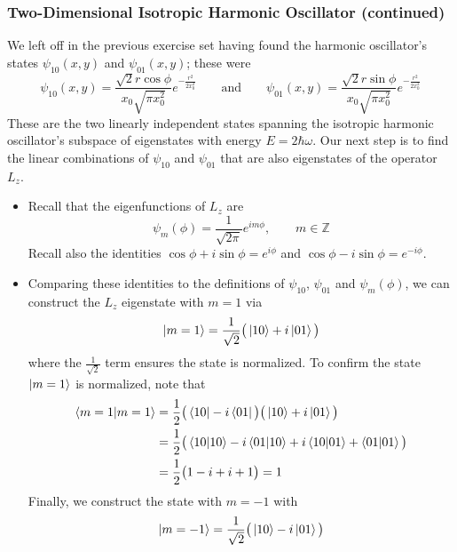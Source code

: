 \documentclass[11pt, a4paper]{article}
\newcommand{\eqtext}[1]{\qquad \text{#1} \qquad}
\begin{document}
\subsubsection{Two-Dimensional Isotropic Harmonic Oscillator (continued)}
We left off in the previous exercise set having found the harmonic oscillator's states $ \psi_{10}(x,y) $ and $ \psi_{01}(x, y) $; these were
\begin{equation*}
	\psi_{10}(x, y) = \frac{\sqrt{2}r \cos \phi}{x_{0}\sqrt{\pi x_{0}^{2}}}e^{-\frac{r^{2}}{2x_{0}^{2}}} \eqtext{and} \psi_{01}(x, y) = \frac{\sqrt{2}r \sin \phi}{x_{0}\sqrt{\pi x_{0}^{2}}}e^{-\frac{r^{2}}{2x_{0}^{2}}}
\end{equation*}
These are the two linearly independent states spanning the isotropic harmonic oscillator's subspace of eigenstates with energy $ E = 2\hbar \omega $. Our next step is to find the linear combinations of $ \psi_{10} $ and $ \psi_{01} $ that are also eigenstates of the operator $ L_{z} $. 
	
\vspace{2mm}
\begin{itemize}
	\item Recall that the eigenfunctions of $ L_{z} $ are 
	\begin{equation*}
		\psi_{m}(\phi) = \frac{1}{\sqrt{2\pi}}e^{im\phi}, \qquad m \in \mathbb{Z}
	\end{equation*}
	Recall also the identities $ \cos \phi + i \sin \phi = e^{i\phi} $ and $ \cos \phi - i \sin \phi = e^{-i\phi} $. 
	
	\item Comparing these identities to the definitions of $ \psi_{10} $, $ \psi_{01} $ and $ \psi_{m}(\phi) $, we can construct the $ L_{z} $ eigenstate with $ m = 1 $ via
	\begin{equation*}
		\ket{m=1} = \frac{1}{\sqrt{2}}\big(\ket{10} + i\ket{01}\big)
	\end{equation*}
	where the $ \frac{1}{\sqrt{2}} $ term ensures the state is normalized. To confirm the state $ \ket{m=1} $ is normalized, note that
	\begin{align*}
		\braket{m=1}{m=1} &= \frac{1}{2}\big(\bra{10} - i\bra{01}\big)\big(\ket{10} + i\ket{01}\big)\\
		&= \frac{1}{2}\big(\braket{10}{10} - i \braket{01}{10} + i\braket{10}{01} + \braket{01}{01}\big)\\
		&=\frac{1}{2}\big(1 -i + i + 1\big) = 1
	\end{align*}
	Finally, we construct the state with $ m = -1 $ with
	\begin{equation*}
		\ket{m=-1} = \frac{1}{\sqrt{2}} \big(\ket{10} - i \ket{01}\big)
	\end{equation*}
	
\end{itemize}
\end{document}
